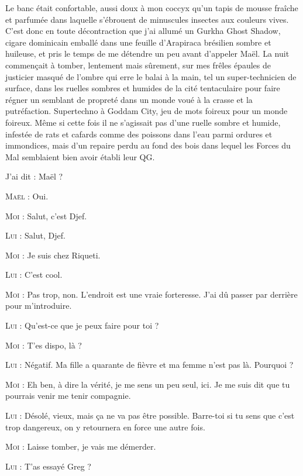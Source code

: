 \illusloflabel{}%
Le banc était confortable, aussi doux à mon coccyx qu’un tapis de mousse fraîche et parfumée dans laquelle s’ébrouent de minuscules insectes aux couleurs vives. C’est donc en toute décontraction que j’ai allumé un Gurkha Ghost Shadow, cigare dominicain emballé dans une feuille d’Arapiraca brésilien sombre et huileuse, et pris le temps de me détendre un peu avant d’appeler Maël. La nuit commençait à tomber, lentement mais sûrement, sur mes frêles épaules de justicier masqué de l’ombre qui erre le balai à la main, tel un super-technicien de surface, dans les ruelles sombres et humides de la cité tentaculaire pour faire régner un semblant de propreté dans un monde voué à la crasse et la putréfaction. Supertechno à Goddam City, jeu de mots foireux pour un monde foireux. Même si cette fois il ne s’agissait pas d’une ruelle sombre et humide, infestée de rats et cafards comme des poissons dans l’eau parmi ordures et immondices, mais d’un repaire perdu au fond des bois dans lequel les Forces du Mal semblaient bien avoir établi leur QG.

\begin{dialogue}

J’ai dit : Maël ?

\textsc{Maël} : Oui.  

\textsc{Moi} : Salut, c’est Djef. 

\textsc{Lui} : Salut, Djef. 

\textsc{Moi} : Je suis chez Riqueti.  

\textsc{Lui} : C’est cool.  

\textsc{Moi} : Pas trop, non. L’endroit est une vraie forteresse. J’ai dû passer par derrière pour m’introduire.  

\textsc{Lui} : Qu’est-ce que je peux faire pour toi ? 

\textsc{Moi} : T’es dispo, là ? 

\textsc{Lui} : Négatif. Ma fille a quarante de fièvre et ma femme n’est pas là. Pourquoi ?  

\textsc{Moi} : Eh ben, à dire la vérité, je me sens un peu seul, ici. Je me suis dit que tu pourrais venir me tenir compagnie.  

\textsc{Lui} : Désolé, vieux, mais ça ne va pas être possible. Barre-toi si tu sens que c’est trop dangereux, on y retournera en force une autre fois.  

\textsc{Moi} : Laisse tomber, je vais me démerder.  

\textsc{Lui} : T’as essayé Greg ?

\end{dialogue}

